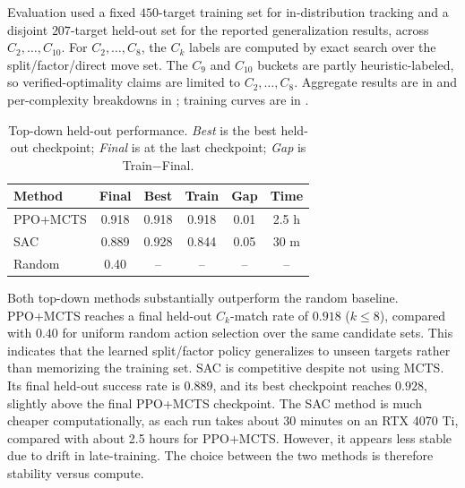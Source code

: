 \documentclass{article}
\theoremstyle{definition}
\theoremstyle{remark}
\begin{document}
Evaluation used a fixed \(450\)-target training set for in-distribution tracking and a disjoint \(207\)-target held-out set for the reported generalization results, across \(C_2,\ldots,C_{10}\). For \(C_2,\ldots,C_8\), the \(C_k\) labels are computed by exact search over the split/factor/direct move set. The \(C_9\) and \(C_{10}\) buckets are partly heuristic-labeled, so verified-optimality claims are limited to \(C_2,\ldots,C_8\). Aggregate results are in  and per-complexity breakdowns in ; training curves are in .

\begin{table}[h]
\centering
\caption{Top-down held-out performance. \textit{Best} is the best held-out checkpoint; \textit{Final} is at the last checkpoint; \textit{Gap} is Train$-$Final.}
\label{tab:topdown-summary}
\small
\setlength{\tabcolsep}{4pt}
\begin{tabular}{@{}lccccc@{}}
\toprule
Method & Final & Best & Train & Gap & Time \\
\midrule
PPO+MCTS & 0.918 & 0.918 & 0.918 & 0.01 & 2.5 h \\
SAC      & 0.889 & 0.928 & 0.844 & 0.05 & 30 m \\
Random   & 0.40  & --    & --    & --   & -- \\
\bottomrule
\end{tabular}
\end{table}

Both top-down methods substantially outperform the random baseline. PPO+MCTS reaches a final held-out \(C_k\)-match rate of \(0.918\) ($k \le 8$), compared with \(0.40\) for uniform random action selection over the same candidate sets. This indicates that the learned split/factor policy generalizes to unseen targets rather than memorizing the training set. SAC is competitive despite not using MCTS. Its final held-out success rate is \(0.889\), and its best checkpoint reaches \(0.928\), slightly above the final PPO+MCTS checkpoint. The SAC method is much cheaper computationally, as each run takes about 30 minutes on an RTX 4070 Ti, compared with about 2.5 hours for PPO+MCTS. However, it appears less stable due to drift in late-training. The choice between the two methods is therefore stability versus compute.
\end{document}
